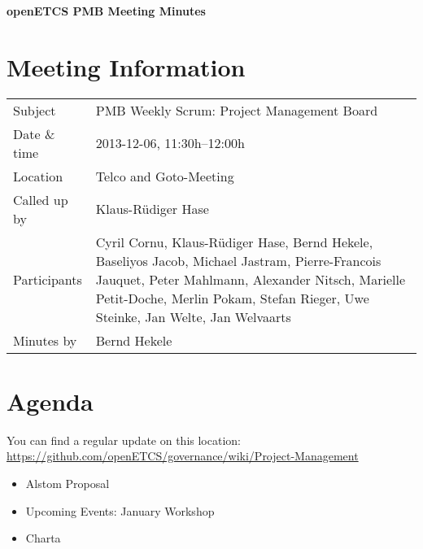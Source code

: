 \documentclass[a4paper, 11pt]{article}
\begin{document}
{\begin{center}\huge\bf openETCS PMB Meeting Minutes\end{center}}
\section{Meeting Information}

\renewcommand{\arraystretch}{1.5}
\begin{supertabular}{m{.2\textwidth}m{.8\textwidth}}
Subject & PMB Weekly Scrum: Project Management Board\\
Date \& time & 2013-12-06, 11:30h--12:00h\\
Location & Telco and Goto-Meeting\\
Called up by & Klaus-R\"udiger Hase\\
Participants &
Cyril Cornu,
Klaus-R\"udiger Hase,
Bernd Hekele,
Baseliyos Jacob,
Michael Jastram,
Pierre-Francois Jauquet,
Peter Mahlmann,
Alexander Nitsch,
Marielle Petit-Doche,
Merlin Pokam,
Stefan Rieger,
Uwe Steinke,
Jan Welte,
Jan Welvaarts
\\

Minutes by & Bernd Hekele\\

\end{supertabular}
\renewcommand{\arraystretch}{1.0}


\section{{Agenda}}
You can find a regular update on this location: \url{https://github.com/openETCS/governance/wiki/Project-Management}

\begin{itemize}

\item Alstom Proposal
\item Upcoming Events: January Workshop
\item Charta
\end{itemize}
\end{document}
